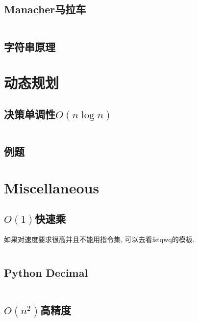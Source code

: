 \documentclass[a4paper, twoside]{article}
\begin{document}
\begin{multicols}{2}
			\subsection{Manacher马拉车}
				\inputminted{cpp}{../src/string/manacher.cpp}
			


			\subsection{字符串原理}
				

		\section{动态规划}
			\subsection{决策单调性$O(n\log n)$}
				\inputminted{cpp}{../src/DP/决策单调性.cpp}
			
			\subsection{例题}

			
		\section{Miscellaneous}
			\subsection{$O(1)$快速乘}
				如果对速度要求很高并且不能用指令集, 可以去看fstqwq的模板.

				\inputminted{cpp}{../src/misc/O(1)快速乘.cpp}
			
			\subsection{Python Decimal}
				\inputminted{python}{../src/misc/decimal.py}
			
			\subsection{$O(n^2)$高精度}
				\inputminted{cpp}{../src/misc/高精度.cpp}
			

\end{multicols}
\end{document}

